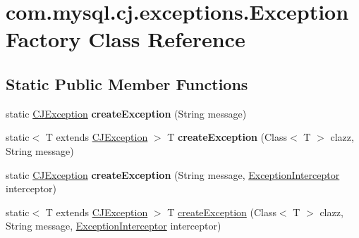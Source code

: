 \hypertarget{classcom_1_1mysql_1_1cj_1_1exceptions_1_1_exception_factory}{}\section{com.\+mysql.\+cj.\+exceptions.\+Exception\+Factory Class Reference}
\label{classcom_1_1mysql_1_1cj_1_1exceptions_1_1_exception_factory}
\subsection*{Static Public Member Functions}
\begin{DoxyCompactItemize}
\item 
\mbox{\label{classcom_1_1mysql_1_1cj_1_1exceptions_1_1_exception_factory_a48cafb99fd5328ce70f8590201536130}} 
static \mbox{\hyperlink{classcom_1_1mysql_1_1cj_1_1exceptions_1_1_c_j_exception}{C\+J\+Exception}} {\bfseries create\+Exception} (String message)
\item 
\mbox{\label{classcom_1_1mysql_1_1cj_1_1exceptions_1_1_exception_factory_ac29411eaa0b0c82e509e582c40f7b1b5}} 
static$<$ T extends \mbox{\hyperlink{classcom_1_1mysql_1_1cj_1_1exceptions_1_1_c_j_exception}{C\+J\+Exception}} $>$ T {\bfseries create\+Exception} (Class$<$ T $>$ clazz, String message)
\item 
\mbox{\label{classcom_1_1mysql_1_1cj_1_1exceptions_1_1_exception_factory_acb21b0c4d8b1f4c02ab289264f33d13f}} 
static \mbox{\hyperlink{classcom_1_1mysql_1_1cj_1_1exceptions_1_1_c_j_exception}{C\+J\+Exception}} {\bfseries create\+Exception} (String message, \mbox{\hyperlink{interfacecom_1_1mysql_1_1cj_1_1exceptions_1_1_exception_interceptor}{Exception\+Interceptor}} interceptor)
\item 
static$<$ T extends \mbox{\hyperlink{classcom_1_1mysql_1_1cj_1_1exceptions_1_1_c_j_exception}{C\+J\+Exception}} $>$ T \mbox{\hyperlink{classcom_1_1mysql_1_1cj_1_1exceptions_1_1_exception_factory_a9fb33af1ff5bf7216c592339f88a3f46}{create\+Exception}} (Class$<$ T $>$ clazz, String message, \mbox{\hyperlink{interfacecom_1_1mysql_1_1cj_1_1exceptions_1_1_exception_interceptor}{Exception\+Interceptor}} interceptor)

\end{DoxyCompactItemize}
